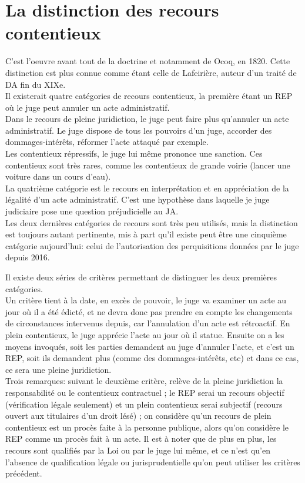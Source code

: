\documentclass[10pt, a4paper, openany]{book}
\begin{document}
\section{La distinction des recours contentieux}

C'est l'oeuvre avant tout de la doctrine et notamment de Ocoq, en 1820. Cette distinction est plus connue comme étant celle de Lafeirière, auteur d'un traité de DA fin du XIXe. \\
Il existerait quatre catégories de recours contentieux, la première étant un REP où le juge peut annuler un acte administratif. \\
Dans le recours de pleine juridiction, le juge peut faire plus qu'annuler un acte administratif. Le juge dispose de tous les pouvoirs d'un juge, accorder des dommages-intérêts, réformer l'acte attaqué par exemple. \\
Les contentieux répressifs, le juge lui même prononce une sanction. Ces contentieux sont très rares, comme les contentieux de grande voirie (lancer une voiture dans un cours d'eau). \\
La quatrième catégorie est le recours en interprétation et en appréciation de la légalité d'un acte administratif. C'est une hypothèse dans laquelle je juge judiciaire pose une question préjudicielle au JA. \\
Les deux dernières catégories de recours sont très peu utilisés, mais la distinction est toujours autant pertinente, mis à part qu'il existe peut être une cinquième catégorie aujourd'hui: celui de l'autorisation des perquisitions données par le juge depuis 2016. 


Il existe deux séries de critères permettant de distinguer les deux premières catégories. \\
Un critère tient à la date, en excès de pouvoir, le juge va examiner un acte au jour où il a été édicté, et ne devra donc pas prendre en compte les changements de circonstances intervenus depuis, car l'annulation d'un acte est rétroactif. En plein contentieux, le juge apprécie l'acte au jour où il statue. Ensuite on a les moyens invoqués, soit les parties demandent au juge d'annuler l'acte, et c'est un REP, soit ils demandent plus (comme des dommages-intérêts, etc) et dans ce cas, ce sera une pleine juridiction. \\
Trois remarques: suivant le deuxième critère, relève de la pleine juridiction la responsabilité ou le contentieux contractuel ; le REP serai un recours objectif (vérification légale seulement) et un plein contentieux serai subjectif (recours ouvert aux titulaires d'un droit lésé) ; on considère qu'un recours de plein contentieux est un procès faite à la personne publique, alors qu'on considère le REP comme un procès fait à un acte. Il est à noter que de plus en plus, les recours sont qualifiés par la Loi ou par le juge lui même, et ce n'est qu'en l'absence de qualification légale ou jurisprudentielle qu'on peut utiliser les critères précédent. 
\end{document}
